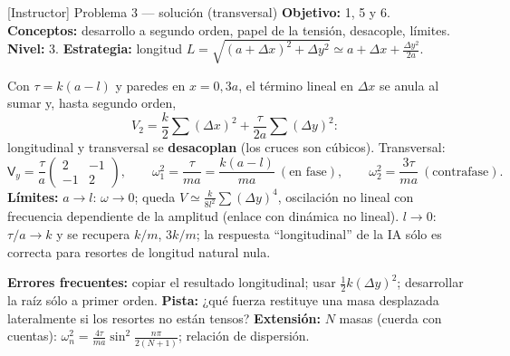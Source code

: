 \documentclass[spanish,10pt]{beamer}
\newcommand{\Vm}{\mathsf{V}}                 %
\begin{document}
\begin{frame}{[Instructor] Problema 3 — solución (transversal)}
\footnotesize
\textbf{Objetivo:} 1, 5 y 6. \textbf{Conceptos:} desarrollo a segundo orden, papel de la tensión, desacople, límites. \textbf{Nivel:} 3. \textbf{Estrategia:} longitud $L=\sqrt{(a+\Delta x)^2+\Delta y^2}\simeq a+\Delta x+\frac{\Delta y^2}{2a}$.

Con $\tau=k(a-l)$ y paredes en $x=0,3a$, el término lineal en $\Delta x$ se anula al sumar y, hasta segundo orden,
\[
V_2=\frac k2\sum(\Delta x)^2+\frac{\tau}{2a}\sum(\Delta y)^2 :
\]
longitudinal y transversal se \textbf{desacoplan} (los cruces son cúbicos). Transversal:
\[
\Vm_y=\frac{\tau}{a}\begin{pmatrix}2&-1\\-1&2\end{pmatrix},\qquad
\omega_1^2=\frac{\tau}{ma}=\frac{k(a-l)}{ma}\ (\text{en fase}),\qquad \omega_2^2=\frac{3\tau}{ma}\ (\text{contrafase}).
\]
\textbf{Límites:} $a\to l$: $\omega\to0$; queda $V\simeq\frac{k}{8l^2}\sum(\Delta y)^4$, oscilación no lineal con frecuencia dependiente de la amplitud (enlace con dinámica no lineal). $l\to0$: $\tau/a\to k$ y se recupera $k/m$, $3k/m$; la respuesta “longitudinal” de la IA sólo es correcta para resortes de longitud natural nula.

\textbf{Errores frecuentes:} copiar el resultado longitudinal; usar $\frac12k(\Delta y)^2$; desarrollar la raíz sólo a primer orden. \textbf{Pista:} ¿qué fuerza restituye una masa desplazada lateralmente si los resortes no están tensos? \textbf{Extensión:} $N$ masas (cuerda con cuentas): $\omega_n^2=\frac{4\tau}{ma}\sin^2\frac{n\pi}{2(N+1)}$; relación de dispersión.
\end{frame}
\end{document}
